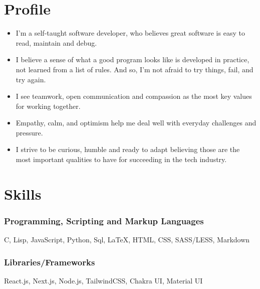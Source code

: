 \documentclass[11pt, oneside, a4paper, titlepage]{article}
\newcommand\skillsVSpace{\vspace{-0.3cm}}
\begin{document}
\begin{tcolorbox}
  \begin{minipage}[t]{8cm}
    \vspace*{-0.5cm}
    \begin{tcolorbox}[grow to left by=0.6cm,colback=gray!25,colframe=white]

      \section*{Profile}
      \begin{itemize}
        \item{
      I'm a self-taught software developer,
      who believes great software is easy to read,
      maintain and debug.
          }
        \skillsVSpace
      \item{
      I believe a sense of what a good program looks like
      is developed in practice, not learned from a list of rules.
      And so, I'm not afraid to try things, fail, and try again.
       }
        \skillsVSpace
        \item{
      I see teamwork, open communication and compassion
      as the most key values for working together.
          }
        \skillsVSpace
        \item{
      Empathy, calm, and optimism
      help me deal well with everyday challenges and pressure.
        }
        \skillsVSpace
      \item{
      I strive to be curious, humble and ready to adapt
      believing those are the most important qualities to have
      for succeeding in the tech industry.
        }
      \end{itemize}


      \section*{Skills}
        \subsubsection{Programming, Scripting and Markup Languages}
        C, Lisp, JavaScript, Python, Sql, {\LaTeX}, HTML, CSS, SASS/LESS, Markdown
        \skillsVSpace
        \subsubsection{Libraries/Frameworks}
        React.js, Next.js, Node.js, TailwindCSS, Chakra UI, Material UI


\end{tcolorbox}
\end{minipage}
\end{tcolorbox}
\end{document}
